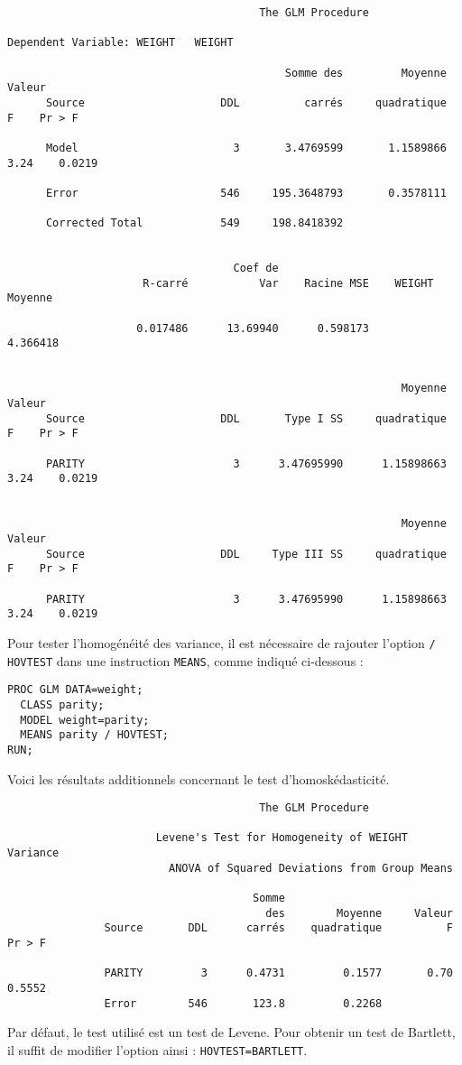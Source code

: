 \begin{verbatim}
                                       The GLM Procedure

Dependent Variable: WEIGHT   WEIGHT

                                           Somme des         Moyenne     Valeur
      Source                     DDL          carrés     quadratique          F    Pr > F

      Model                        3       3.4769599       1.1589866       3.24    0.0219

      Error                      546     195.3648793       0.3578111

      Corrected Total            549     198.8418392


                                   Coef de
                     R-carré           Var    Racine MSE    WEIGHT Moyenne

                    0.017486      13.69940      0.598173          4.366418


                                                             Moyenne     Valeur
      Source                     DDL       Type I SS     quadratique          F    Pr > F

      PARITY                       3      3.47695990      1.15898663       3.24    0.0219


                                                             Moyenne     Valeur
      Source                     DDL     Type III SS     quadratique          F    Pr > F

      PARITY                       3      3.47695990      1.15898663       3.24    0.0219
\end{verbatim}

Pour tester l'homogénéité des variance, il est nécessaire de rajouter
l'option \verb|/ HOVTEST| dans une instruction \texttt{MEANS}, comme indiqué
ci-dessous :
\begin{verbatim}
PROC GLM DATA=weight; 
  CLASS parity; 
  MODEL weight=parity;
  MEANS parity / HOVTEST;
RUN;
\end{verbatim}
Voici les résultats additionnels concernant le test d'homoskédasticité.
\begin{verbatim}
                                       The GLM Procedure

                       Levene's Test for Homogeneity of WEIGHT Variance
                         ANOVA of Squared Deviations from Group Means

                                      Somme
                                        des        Moyenne     Valeur
               Source       DDL      carrés    quadratique          F    Pr > F

               PARITY         3      0.4731         0.1577       0.70    0.5552
               Error        546       123.8         0.2268
\end{verbatim}
Par défaut, le test utilisé est un test de Levene. Pour obtenir un test de
Bartlett, il suffit de modifier l'option ainsi : \verb|HOVTEST=BARTLETT|.

